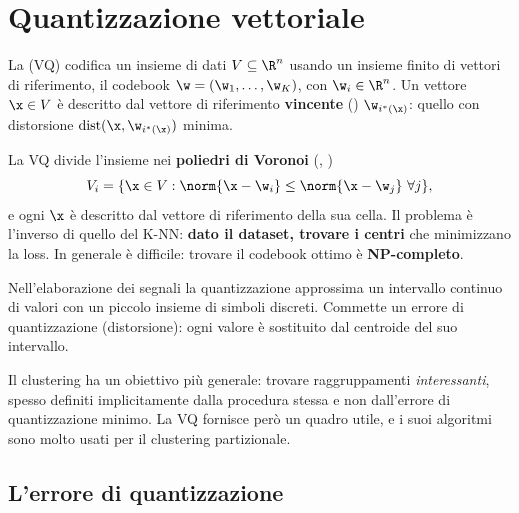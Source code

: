 \section{Quantizzazione vettoriale}

\begin{definizione}
La  (VQ) codifica un insieme di dati $V\subseteq\R^n$ usando un insieme finito
di vettori di riferimento, il codebook $\w = (\w_1,\dots,\w_K)$, con $\w_i\in\R^n$. Un vettore $\x\in V$ è descritto
dal vettore di riferimento \textbf{vincente} () $\w_{i^*(\x)}$: quello con distorsione
$\mathrm{dist}(\x,\w_{i^*(\x)})$ minima.
\end{definizione}

La VQ divide l'insieme nei \textbf{poliedri di Voronoi} (, )
\[
V_i = \{\x\in V : \norm{\x-\w_i}\le\norm{\x-\w_j}\ \forall j\},
\]
e ogni $\x$ è descritto dal vettore di riferimento della sua cella. Il problema è l'inverso di quello del K-NN:
\textbf{dato il dataset, trovare i centri} che minimizzano la loss. In generale è difficile: trovare il codebook ottimo è
\textbf{NP-completo}.

\begin{esempio}
Nell'elaborazione dei segnali la quantizzazione approssima un intervallo continuo di valori con un piccolo insieme di
simboli discreti. Commette un errore di quantizzazione (distorsione): ogni valore è sostituito dal centroide del suo
intervallo.
\begin{center}
\end{center}
\end{esempio}

Il clustering ha un obiettivo più generale: trovare raggruppamenti \emph{interessanti}, spesso definiti
implicitamente dalla procedura stessa e non dall'errore di quantizzazione minimo. La VQ fornisce però un quadro
utile, e i suoi algoritmi sono molto usati per il clustering partizionale.

\subsection{L'errore di quantizzazione}

